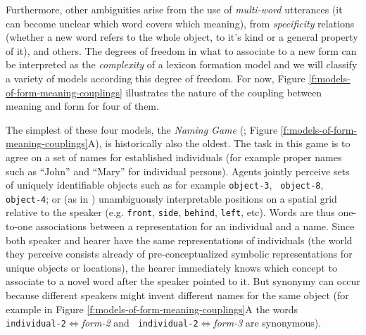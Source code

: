 Furthermore, other ambiguities arise from the use of \emph{multi-word}
utterances (it can become unclear which word covers which meaning),
from \emph{specificity} relations (whether a new word refers to the
whole object, to it's kind or a general property of it), and others.
The degrees of freedom in what to associate to a new form can be
interpreted as the \emph{complexity} of a lexicon formation model and
we will classify a variety of models according this degree of
freedom. For now, Figure \ref{f:models-of-form-meaning-couplings}
illustrates the nature of the coupling between meaning and form for
four of them.

The simplest of these four models, the \emph{Naming Game}
(\citealp{steels95selforganizing,steels99spatially}; Figure
\ref{f:models-of-form-meaning-couplings}A), is historically also the
oldest. The task in this game is to agree on a set of names for
established individuals (for example proper names such as ``John'' and
``Mary'' for individual persons).  Agents jointly perceive sets of
uniquely identifiable objects such as for example {\tt object-3}, {\tt
  object-8}, {\tt object-4}; or (as in
\citealp{steels95selforganizing}) unambiguously interpretable
positions on a spatial grid relative to the speaker (e.g. {\tt front},
{\tt side}, {\tt behind}, {\tt left}, etc). Words are thus one-to-one
associations between a representation for an individual and a name.
Since both speaker and hearer have the same representations of
individuals (the world they perceive consists already of
pre-conceptualized symbolic representations for unique objects or
locations), the hearer immediately knows which concept to associate to
a novel word after the speaker pointed to it. But synonymy can occur
because different speakers might invent different names for the same
object (for example in Figure
\ref{f:models-of-form-meaning-couplings}A the words {\tt
  individual-2}$\Leftrightarrow$\emph{form-2} and {\tt
  individual-2}$\Leftrightarrow$\emph{form-3} are synonymous).


